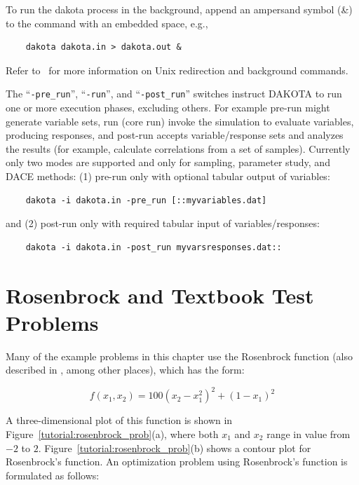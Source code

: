 To run the dakota process in the background, append an ampersand
symbol (\&) to the command with an embedded space, e.g.,
\begin{small}
\begin{verbatim}
    dakota dakota.in > dakota.out &
\end{verbatim}
\end{small}

Refer to~\cite{And86} for more information on Unix redirection and
background commands.

The ``\texttt{-pre\_run}'', ``\texttt{-run}'', and
``\texttt{-post\_run}'' switches instruct DAKOTA to run one or more
execution phases, excluding others.  For example pre-run might
generate variable sets, run (core run) invoke the simulation to
evaluate variables, producing responses, and post-run accepts
variable/response sets and analyzes the results (for example,
calculate correlations from a set of samples).  Currently only two
modes are supported and only for sampling, parameter study, and DACE
methods: (1) pre-run only with optional tabular output of variables:
\begin{small}
\begin{verbatim}
    dakota -i dakota.in -pre_run [::myvariables.dat]
\end{verbatim}
\end{small}
and (2) post-run only with required tabular input of variables/responses:
\begin{small}
\begin{verbatim}
    dakota -i dakota.in -post_run myvarsresponses.dat::
\end{verbatim}
\end{small}

 
\section{Rosenbrock and Textbook Test Problems}\label{tutorial:rosenbrock}

Many of the example problems in this chapter use the Rosenbrock
function \cite{Rosenbrock60} (also described in \cite{Gil81}, among
other places), which has the form:

\begin{equation}
f(x_1,x_2)=100(x_2-x_1^2)^2+(1-x_1)^2 \label{tutorial:rosen}
\end{equation}

A three-dimensional plot of this function is shown in
Figure~\ref{tutorial:rosenbrock_prob}(a), where both $x_1$ and
$x_2$ range in value from $-2$ to $2$.
Figure~\ref{tutorial:rosenbrock_prob}(b) shows a contour plot
for Rosenbrock's function. An optimization problem using Rosenbrock's
function is formulated as follows:

